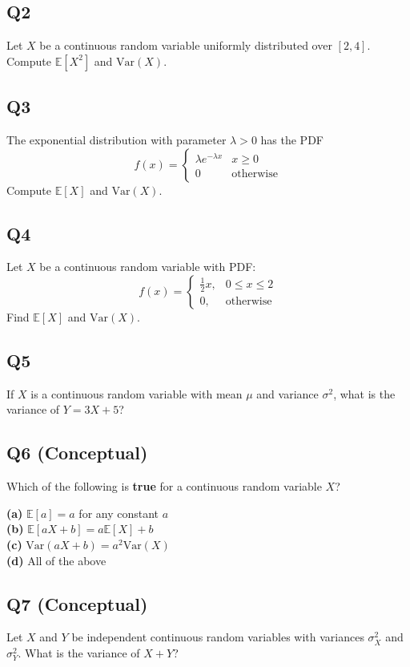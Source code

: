 \subsection*{Q2}
Let $X$ be a continuous random variable uniformly distributed over $[2, 4]$. Compute $\mathbb{E}[X^2]$ and $\text{Var}(X)$.

\subsection*{Q3}
The exponential distribution with parameter $\lambda > 0$ has the PDF
\[
f(x) = \begin{cases}
\lambda e^{-\lambda x} & x \geq 0 \\
0 & \text{otherwise}
\end{cases}
\]
Compute $\mathbb{E}[X]$ and $\text{Var}(X)$.

\subsection*{Q4}
Let $X$ be a continuous random variable with PDF:
\[
f(x) = \begin{cases}
\frac{1}{2}x, & 0 \leq x \leq 2 \\
0, & \text{otherwise}
\end{cases}
\]
Find $\mathbb{E}[X]$ and $\text{Var}(X)$.

\subsection*{Q5}
If $X$ is a continuous random variable with mean $\mu$ and variance $\sigma^2$, what is the variance of $Y = 3X + 5$?

\subsection*{Q6 (Conceptual)}
Which of the following is \textbf{true} for a continuous random variable $X$?

\textbf{(a)} $\mathbb{E}[a] = a$ for any constant $a$ \\
\textbf{(b)} $\mathbb{E}[aX + b] = a\mathbb{E}[X] + b$ \\
\textbf{(c)} $\text{Var}(aX + b) = a^2\text{Var}(X)$ \\
\textbf{(d)} All of the above

\subsection*{Q7 (Conceptual)}
Let $X$ and $Y$ be independent continuous random variables with variances $\sigma_X^2$ and $\sigma_Y^2$. What is the variance of $X + Y$?

